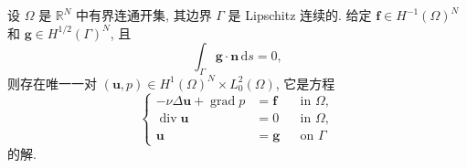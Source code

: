 \setcounter{statement}{0}
\begin{Theorem}\label{thm:stokes-dirichlet-well-posedness}
设 $\Omega$ 是 $\mathbb{R}^N$ 中有界连通开集, 其边界
$\Gamma$ 是 Lipschitz 连续的. 给定
$\mathbf{f}\in H^{-1}(\Omega)^N$ 和
$\mathbf{g}\in H^{1/2}(\Gamma)^N$, 且
\begin{equation}\label{eq:stokes-boundary-flux-compatibility}
\int_\Gamma\mathbf{g}\cdot\mathbf{n}\,\mathrm{d}s=0,
\end{equation}
则存在唯一一对
$(\mathbf{u},p)\in H^1(\Omega)^N\times L_0^2(\Omega)$,
它是方程
\begin{equation}\label{eq:stokes-dirichlet-problem}
\left\{
\begin{aligned}
-\nu\Delta\mathbf{u}+\operatorname{grad}p&=\mathbf{f}
&&\text{in }\Omega,\\
\operatorname{div}\mathbf{u}&=0
&&\text{in }\Omega,\\
\mathbf{u}&=\mathbf{g}
&&\text{on }\Gamma
\end{aligned}
\right.
\end{equation}
的解.
\end{Theorem}
